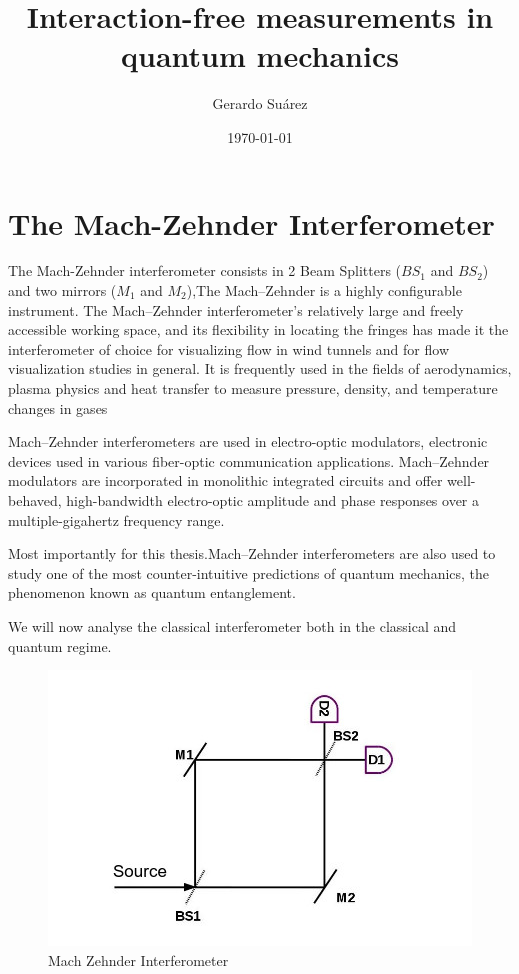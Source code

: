 \documentclass[11pt]{article}
\title{\textbf{Interaction-free measurements in quantum mechanics}}
\author{Gerardo Suárez}
\date{\small{\today}}
\begin{document}
\maketitle

\section{The Mach-Zehnder Interferometer }

The Mach-Zehnder interferometer consists in 2 Beam Splitters ($BS_{1}$ and $BS_{2}$) and two mirrors ($M_{1}$ and $M_{2}$),The Mach–Zehnder is a highly configurable instrument. The Mach–Zehnder interferometer's relatively large and freely accessible working space, and its flexibility in locating the fringes has made it the interferometer of choice for visualizing flow in wind tunnels \cite{10} and for flow visualization studies in general. It is frequently used in the fields of aerodynamics, plasma physics and heat transfer to measure pressure, density, and temperature changes in gases \cite{11}

Mach–Zehnder interferometers are used in electro-optic modulators, electronic devices used in various fiber-optic communication applications. Mach–Zehnder modulators are incorporated in monolithic integrated circuits and offer well-behaved, high-bandwidth electro-optic amplitude and phase responses over a multiple-gigahertz frequency range.

Most importantly for this thesis.Mach–Zehnder interferometers are also used to study one of the most counter-intuitive predictions of quantum mechanics, the phenomenon known as quantum entanglement.

We will now analyse the classical interferometer both in the classical and quantum regime.






\begin{figure}[h!]
\centering
\includegraphics[width=\linewidth]{machzenhderingles.jpg}
\caption{Mach Zehnder Interferometer}
\label{fig:BS2}
\end{figure}
\end{document}
